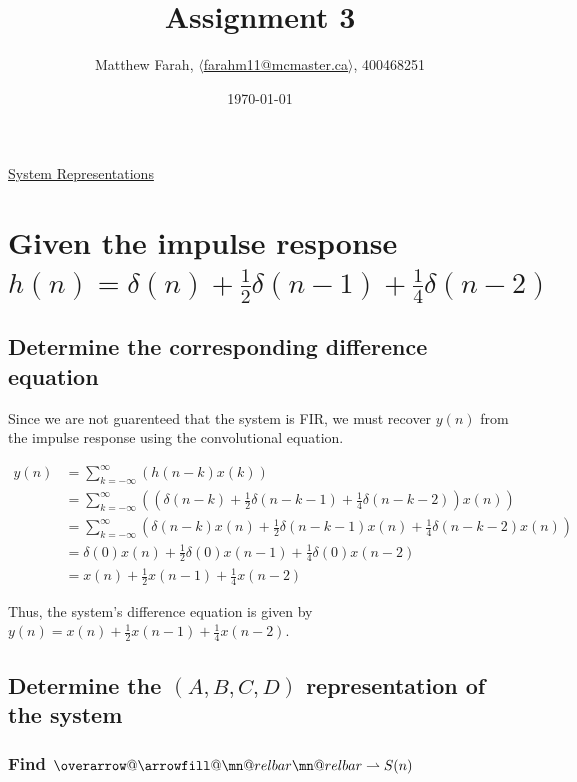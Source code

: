 \documentclass{article}
\title{Assignment 3}
\author{Matthew Farah, \href{mailto:farahm11@mcmaster.ca}{$\langle$farahm11@mcmaster.ca$\rangle$}, 400468251}
\date{\today}
\makeatletter
\renewcommand{\thesubsection}{\thesection.\alph{subsection}}
\renewcommand{\thesubsubsection}{\thesection.\alph{subsection}.\Roman{subsubsection}}
\DeclareRobustCommand{\overrightharpoon}{\mathpalette{\overarrow@\rightharpoonfill@}}
\def\rightharpoonfill@{\arrowfill@\mn@relbar\mn@relbar\rightharpoonup}
\makeatother
\begin{document}
\maketitle
\pagestyle{fancy}

\begin{center}
	\Large{\underline{System Representations}}
\end{center}

\section[Question ~\thesection]{Given the impulse response $h(n) = \delta(n) + \frac{1}{2}\delta(n - 1) + \frac{1}{4}\delta(n - 2)$}

\subsection[~\thesubsection]{Determine the corresponding difference equation}

Since we are not guarenteed that the system is FIR, we must recover $y(n)$ from the impulse response using the convolutional equation.

\begin{align*}
	y(n) &= \sum_{k = -\infty}^{\infty}(h(n - k)x(k)) \\
	&= \sum_{k = -\infty}^{\infty}((\delta(n - k) + \frac{1}{2}\delta(n - k - 1) + \frac{1}{4}\delta(n - k - 2))x(n)) \\
	&= \sum_{k = -\infty}^{\infty}(\delta(n - k)x(n) + \frac{1}{2}\delta(n - k - 1)x(n) + \frac{1}{4}\delta(n - k - 2)x(n)) \\
	&= \delta(0)x(n) + \frac{1}{2}\delta(0)x(n - 1) + \frac{1}{4}\delta(0)x(n - 2) \\
	&= x(n) + \frac{1}{2}x(n - 1) + \frac{1}{4}x(n - 2)
\end{align*}

Thus, the system's difference equation is given by $y(n) = x(n) + \frac{1}{2}x(n - 1) + \frac{1}{4}x(n - 2)$.

\subsection[~\thesubsection]{Determine the $(A, B, C, D)$ representation of the system}

\subsubsection[~\thesubsubsection]{Find $\overrightharpoon{S(n)}$}
\end{document}
